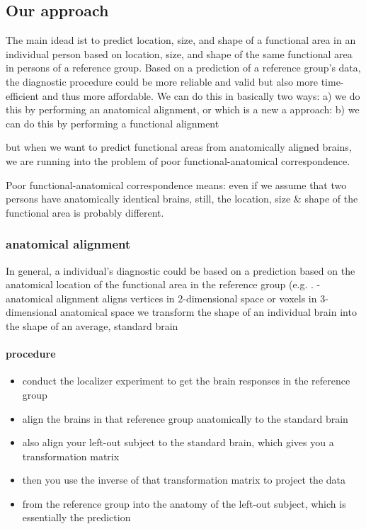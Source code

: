 \subsection{Our approach}
The main idead ist to predict location, size, and shape of a functional area in
an individual person based on location, size, and shape of the same functional
area in persons of a reference group.
%
Based on a prediction of a reference group's data, the diagnostic procedure
could be more reliable and valid but also more time-efficient and thus more
affordable.
%
We can do this in basically two ways:
a) we do this by performing an anatomical alignment, or
%
which is a new a approach:
%
b) we can do this by performing a functional alignment
%

but when we want to predict functional areas from anatomically aligned brains,
we are running into the problem of poor
functional-anatomical correspondence.

Poor functional-anatomical correspondence means:
even if we assume that two persons have anatomically identical brains, still,
the location, size \& shape of the functional area is probably different.


\subsubsection{anatomical alignment}

In general, a individual's diagnostic could be based on a prediction based on
the anatomical location of the functional area in the reference group (e.g.
\citet{weiner2018defining}.
%
- anatomical alignment aligns vertices in 2-dimensional space or voxels in
3-dimensional anatomical space
%
we transform the shape of an individual brain into the shape of an average,
standard brain


\paragraph{procedure}
%
\begin{itemize}
    \item conduct the localizer experiment to get the brain responses in the
    reference group
    \item align the brains in that reference group anatomically to the standard
    brain
    \item also align your left-out subject to the standard brain, which gives
    you a transformation matrix
    \item then you use the inverse of that transformation matrix to project the
    data
    \item from the reference group into the anatomy of the left-out subject,
    which is essentially the prediction
\end{itemize}


